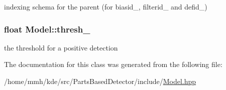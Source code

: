 indexing schema for the parent (for biasid\-\_\-, filterid\-\_\- and defid\-\_\-) 

\hypertarget{classModel_ac2263c14bbd27a5fed433494354e2b02}{
\subsubsection[{thresh\-\_\-}]{\setlength{\rightskip}{0pt plus 5cm}float Model\-::thresh\-\_\-\hspace{0.3cm}{\ttfamily [protected]}}}\label{classModel_ac2263c14bbd27a5fed433494354e2b02}


the threshold for a positive detection 



The documentation for this class was generated from the following file\-:\begin{DoxyCompactItemize}
\item 
/home/mmh/kde/src/\-Parts\-Based\-Detector/include/\hyperlink{Model_8hpp}{Model.\-hpp}\end{DoxyCompactItemize}

